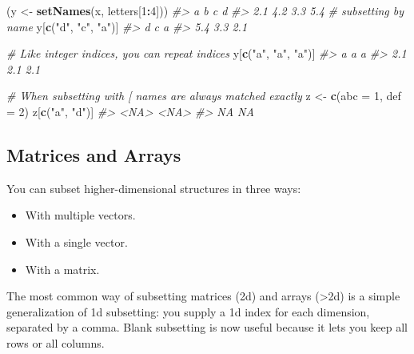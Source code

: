 \documentclass[]{book}
\newenvironment{Shaded}{\begin{snugshade}}{\end{snugshade}}
\newcommand{\KeywordTok}[1]{\textcolor[rgb]{0.13,0.29,0.53}{\textbf{#1}}}
\newcommand{\DataTypeTok}[1]{\textcolor[rgb]{0.13,0.29,0.53}{#1}}
\newcommand{\DecValTok}[1]{\textcolor[rgb]{0.00,0.00,0.81}{#1}}
\newcommand{\StringTok}[1]{\textcolor[rgb]{0.31,0.60,0.02}{#1}}
\newcommand{\CommentTok}[1]{\textcolor[rgb]{0.56,0.35,0.01}{\textit{#1}}}
\newcommand{\OperatorTok}[1]{\textcolor[rgb]{0.81,0.36,0.00}{\textbf{#1}}}
\newcommand{\NormalTok}[1]{#1}
\providecommand{\tightlist}{%
  \setlength{\itemsep}{0pt}\setlength{\parskip}{0pt}}
\theoremstyle{definition}
\theoremstyle{definition}
\theoremstyle{definition}
\theoremstyle{remark}
\begin{document}
\begin{Shaded}
\begin{Highlighting}[]
\NormalTok{(y <-}\StringTok{ }\KeywordTok{setNames}\NormalTok{(x, letters[}\DecValTok{1}\OperatorTok{:}\DecValTok{4}\NormalTok{]))}
\CommentTok{#>   a   b   c   d }
\CommentTok{#> 2.1 4.2 3.3 5.4}
\CommentTok{# subsetting by name}
\NormalTok{y[}\KeywordTok{c}\NormalTok{(}\StringTok{"d"}\NormalTok{, }\StringTok{"c"}\NormalTok{, }\StringTok{"a"}\NormalTok{)]}
\CommentTok{#>   d   c   a }
\CommentTok{#> 5.4 3.3 2.1}

\CommentTok{# Like integer indices, you can repeat indices}
\NormalTok{y[}\KeywordTok{c}\NormalTok{(}\StringTok{"a"}\NormalTok{, }\StringTok{"a"}\NormalTok{, }\StringTok{"a"}\NormalTok{)]}
\CommentTok{#>   a   a   a }
\CommentTok{#> 2.1 2.1 2.1}

\CommentTok{# When subsetting with [ names are always matched exactly}
\NormalTok{z <-}\StringTok{ }\KeywordTok{c}\NormalTok{(}\DataTypeTok{abc =} \DecValTok{1}\NormalTok{, }\DataTypeTok{def =} \DecValTok{2}\NormalTok{)}
\NormalTok{z[}\KeywordTok{c}\NormalTok{(}\StringTok{"a"}\NormalTok{, }\StringTok{"d"}\NormalTok{)]}
\CommentTok{#> <NA> <NA> }
\CommentTok{#>   NA   NA}
\end{Highlighting}
\end{Shaded}

\subsection{Matrices and Arrays}\label{matrices-and-arrays-1}

You can subset higher-dimensional structures in three ways:

\begin{itemize}
\tightlist
\item
  With multiple vectors.
\item
  With a single vector.
\item
  With a matrix.
\end{itemize}

The most common way of subsetting matrices (2d) and arrays
(\textgreater{}2d) is a simple generalization of 1d subsetting: you
supply a 1d index for each dimension, separated by a comma. Blank
subsetting is now useful because it lets you keep all rows or all
columns.
\end{document}

